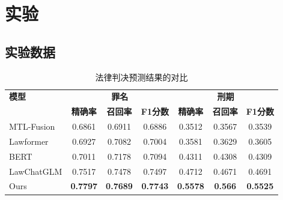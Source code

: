 \section{\heiti 实验}

\subsection{\heiti 实验数据}
\begin{table}[htbp]
	\centering
	\caption{ 法律判决预测结果的对比}
	\begin{tabular}{lcccccc}
		\toprule
		\textbf{模型} & \multicolumn{3}{c}{\textbf{罪名}} & \multicolumn{3}{c}{\textbf{刑期}}                                                               \\
		\cmidrule(lr){2-4} \cmidrule(lr){5-7}
		            & \textbf{精确率}                    & \textbf{召回率}                    & \textbf{F1分数} & \textbf{精确率} & \textbf{召回率} & \textbf{F1分数} \\
		\midrule
		MTL-Fusion  & 0.6861                          & 0.6911                          & 0.6886        & 0.3512       & 0.3567       & 0.3539        \\
		Lawformer   & 0.6927                          & 0.7082                          & 0.7004        & 0.3581       & 0.3629       & 0.3605        \\
		BERT        & 0.7011                          & 0.7178                          & 0.7094        & 0.4311       & 0.4308       & 0.4309        \\
		LawChatGLM  & 0.7517                          & 0.7478                          & 0.7497        & 0.4712       & 0.4671       & 0.4691        \\
		Ours        & \textbf{0.7797}                          & \textbf{0.7689}                          & \textbf{0.7743}        & \textbf{0.5578}       & \textbf{0.566}        & \textbf{0.5525}        \\
		\bottomrule
	\end{tabular}
	\label{tab:performance_comparison}
\end{table}

